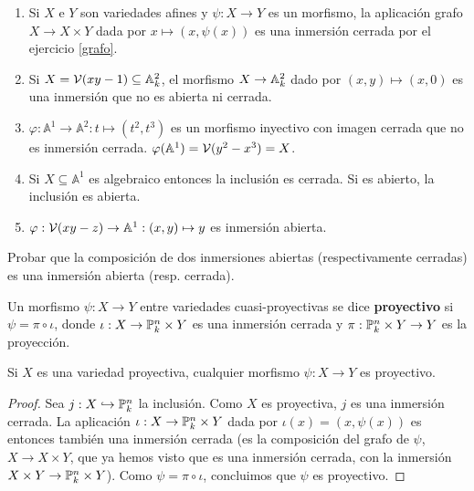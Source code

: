 \documentclass[ACGA.tex]{subfiles}
\begin{document}
\begin{ejs}
 \begin{enumerate}
  \item Si $X$ e $Y$ son variedades afines y $\psi:X\to Y$ es un morfismo, la aplicación grafo $X\to X\times Y$ dada por $x\mapsto (x,\psi(x))$ es una inmersión cerrada por el ejercicio \ref{grafo}.
  \item Si $X=\mathcal{V}(xy-1)\subseteq\mathbb{A}^2_k$, el morfismo $X\to\mathbb{A}^2_k$ dado por $(x,y)\mapsto (x,0)$ es una inmersión que no es abierta ni cerrada. 
  \item $\varphi:\mathbb{A}^1\to\mathbb{A}^2:t\mapsto(t^2,t^3)$ es un morfismo inyectivo con imagen cerrada que no es inmersión cerrada. $\varphi(\mathbb{A}^1)=\mathcal{V}(y^2-x^3)=X$. 
  \item Si $X\subseteq\mathbb{A}^1$ es algebraico entonces la inclusión es cerrada. Si es abierto, la inclusión es abierta.
  \item $\varphi:\mathcal{V}(xy-z)\to\mathbb{A}^1:(x,y)\mapsto y$ es inmersión abierta.
 \end{enumerate}
\end{ejs}


\begin{ejer}
 Probar que la composición de dos inmersiones abiertas (respectivamente cerradas) es una inmersión abierta (resp. cerrada).
\end{ejer}

\begin{defi}
 Un morfismo $\psi:X\to Y$ entre variedades cuasi-proyectivas se dice {\bf proyectivo} si $\psi=\pi\circ\iota$, donde $\iota:X\to \mathbb{P}^n_k\times Y$ es una inmersión cerrada y $\pi:\mathbb{P}^n_k\times Y\to Y$ es la proyección.
\end{defi}

\begin{prop}
 Si $X$ es una variedad proyectiva, cualquier morfismo $\psi:X\to Y$ es proyectivo.
\end{prop}

\begin{proof}
 Sea $j:X\hookrightarrow\mathbb{P}^n_k$ la inclusión. Como $X$ es proyectiva, $j$ es una inmersión cerrada. La aplicación $\iota:X\to \mathbb{P}^n_k\times Y$ dada por $\iota(x)=(x,\psi(x))$ es entonces también una inmersión cerrada (es  la composición del grafo de $\psi$, $X\to X\times Y$, que ya hemos visto que es una inmersión cerrada, con la inmersión $X\times Y\to\mathbb{P}^n_k\times Y$). Como $\psi=\pi\circ\iota$, concluimos que $\psi$ es proyectivo. 
\end{proof}
\end{document}
